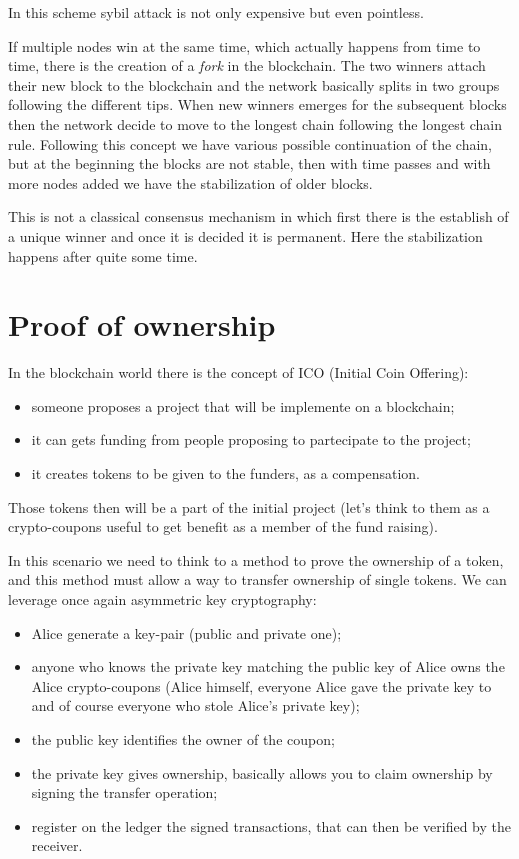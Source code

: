 In this scheme sybil attack is not only expensive but even pointless.

If multiple nodes win at the same time, which actually happens from time to time, there is the creation of a \emph{fork} in the blockchain.
The two winners attach their new block to the blockchain and the network basically splits in two groups following the different tips.
When new winners emerges for the subsequent blocks then the network decide to move to the longest chain following the longest chain rule.
Following this concept we have various possible continuation of the chain, but at the beginning the blocks are not stable, then with time passes and with more nodes added we have the stabilization of older blocks.

This is not a classical consensus mechanism in which first there is the establish of a unique winner and once it is decided it is permanent.
Here the stabilization happens after quite some time.

\section{Proof of ownership}
In the blockchain world there is the concept of ICO (Initial Coin Offering):
\begin{itemize}
    \item someone proposes a project that will be implemente on a blockchain;
    \item it can gets funding from people proposing to partecipate to the project;
    \item it creates tokens to be given to the funders, as a compensation.
\end{itemize}
Those tokens then will be a part of the initial project (let's think to them as a crypto-coupons useful to get benefit as a member of the fund raising).

In this scenario we need to think to a method to prove the ownership of a token, and this method must allow a way to transfer ownership of single tokens.
We can leverage once again asymmetric key cryptography:
\begin{itemize}
    \item Alice generate a key-pair (public and private one);
    \item anyone who knows the private key matching the public key of Alice owns the Alice crypto-coupons (Alice himself, everyone Alice gave the private key to and of course everyone who stole Alice's private key);
    \item the public key identifies the owner of the coupon;
    \item the private key gives ownership, basically allows you to claim ownership by signing the transfer operation;
    \item register on the ledger the signed transactions, that can then be verified by the receiver.
\end{itemize}

